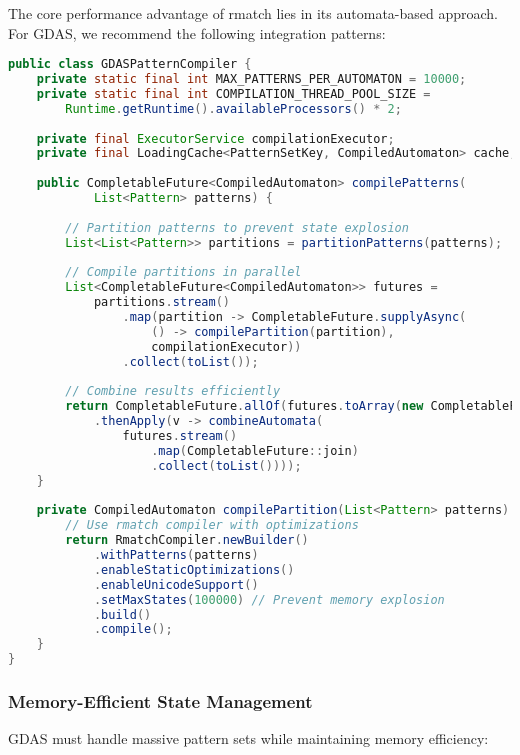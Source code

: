 \documentclass[11pt,a4paper]{article}
\begin{document}
The core performance advantage of rmatch lies in its automata-based approach. For GDAS, we recommend the following integration patterns:

\begin{lstlisting}[language=Java, caption=Efficient Pattern Set Compilation]
public class GDASPatternCompiler {
    private static final int MAX_PATTERNS_PER_AUTOMATON = 10000;
    private static final int COMPILATION_THREAD_POOL_SIZE = 
        Runtime.getRuntime().availableProcessors() * 2;
    
    private final ExecutorService compilationExecutor;
    private final LoadingCache<PatternSetKey, CompiledAutomaton> cache;
    
    public CompletableFuture<CompiledAutomaton> compilePatterns(
            List<Pattern> patterns) {
        
        // Partition patterns to prevent state explosion
        List<List<Pattern>> partitions = partitionPatterns(patterns);
        
        // Compile partitions in parallel
        List<CompletableFuture<CompiledAutomaton>> futures = 
            partitions.stream()
                .map(partition -> CompletableFuture.supplyAsync(
                    () -> compilePartition(partition), 
                    compilationExecutor))
                .collect(toList());
        
        // Combine results efficiently
        return CompletableFuture.allOf(futures.toArray(new CompletableFuture[0]))
            .thenApply(v -> combineAutomata(
                futures.stream()
                    .map(CompletableFuture::join)
                    .collect(toList())));
    }
    
    private CompiledAutomaton compilePartition(List<Pattern> patterns) {
        // Use rmatch compiler with optimizations
        return RmatchCompiler.newBuilder()
            .withPatterns(patterns)
            .enableStaticOptimizations()
            .enableUnicodeSupport()
            .setMaxStates(100000) // Prevent memory explosion
            .build()
            .compile();
    }
}
\end{lstlisting}

\subsubsection{Memory-Efficient State Management}

GDAS must handle massive pattern sets while maintaining memory efficiency:
\end{document}
